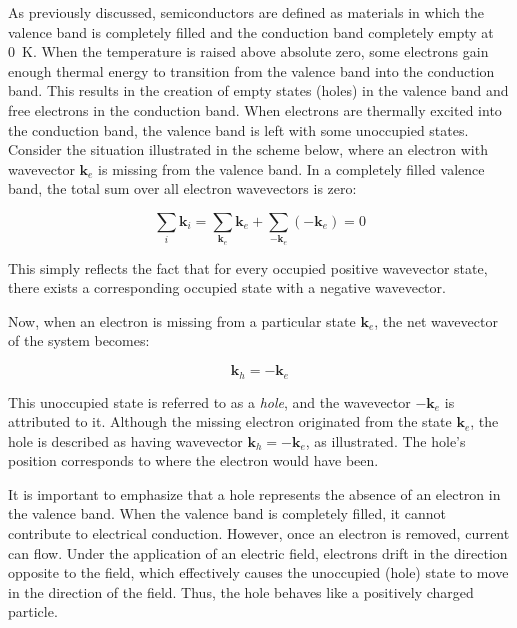 As previously discussed, semiconductors are defined as materials in which the valence band is completely filled and the conduction band completely empty at 0~K. When the temperature is raised above absolute zero, some electrons gain enough thermal energy to transition from the valence band into the conduction band. This results in the creation of empty states (holes) in the valence band and free electrons in the conduction band.
When electrons are thermally excited into the conduction band, the valence band is left with some unoccupied states. Consider the situation illustrated in the scheme below, where an electron with wavevector \( \mathbf{k}_e \) is missing from the valence band. In a completely filled valence band, the total sum over all electron wavevectors is zero:

\begin{equation*}
	\sum_i \mathbf{k}_i = \sum_{\mathbf{k}_e} \mathbf{k}_e + \sum_{-\mathbf{k}_e} (-\mathbf{k}_e) = 0
\end{equation*}

\noindent
This simply reflects the fact that for every occupied positive wavevector state, there exists a corresponding occupied state with a negative wavevector.

Now, when an electron is missing from a particular state \( \mathbf{k}_e \), the net wavevector of the system becomes:

\begin{equation*}
	\mathbf{k}_h = -\mathbf{k}_e
\end{equation*}

\noindent
This unoccupied state is referred to as a \textit{hole}, and the wavevector \( -\mathbf{k}_e \) is attributed to it. Although the missing electron originated from the state \( \mathbf{k}_e \), the hole is described as having wavevector \( \mathbf{k}_h = -\mathbf{k}_e \), as illustrated. The hole's position corresponds to where the electron would have been.

It is important to emphasize that a hole represents the absence of an electron in the valence band. When the valence band is completely filled, it cannot contribute to electrical conduction. However, once an electron is removed, current can flow. Under the application of an electric field, electrons drift in the direction opposite to the field, which effectively causes the unoccupied (hole) state to move in the direction of the field. Thus, the hole behaves like a positively charged particle.

